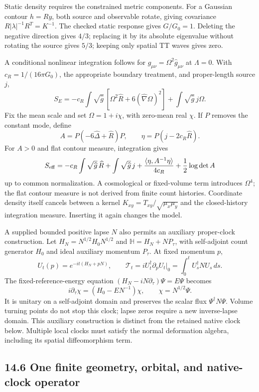 \documentclass[11pt]{article}
\begin{document}
Static density requires the constrained metric components.
For a Gaussian contour \(h=Ry\), both source and observable
rotate, giving covariance \(R|\lambda|^{-1}R^T=K^{-1}\).
The checked static response gives \(G/G_0=1\).
Deleting the negative direction gives \(4/3\); replacing it
by its absolute eigenvalue without rotating the source gives
\(5/3\); keeping only spatial TT waves gives zero.

A conditional nonlinear integration follows for
\(g_{\mu\nu}=\Omega^2\widehat g_{\mu\nu}\) at \(\Lambda=0\).
With \(c_R=1/(16\pi G_0)\), the appropriate boundary treatment,
and proper-length source \(j\),
\[
S_E=-c_R\int\sqrt{\widehat g}
\,[\Omega^2\widehat R+6(\widehat\nabla\Omega)^2]
+\int\sqrt{\widehat g}\,j\Omega .
\]
Fix the mean scale and set \(\Omega=1+i\chi\), with zero-mean
real \(\chi\). If \(P\) removes the constant mode, define
\[
A=P(-6\widehat\Delta+\widehat R)P,\qquad
\eta=P(j-2c_R\widehat R).
\]
For \(A>0\) and flat contour measure, integration gives
\[
S_{\rm eff}=-c_R\int\sqrt{\widehat g}\,\widehat R
+\int\sqrt{\widehat g}\,j
+\frac{\langle\eta,A^{-1}\eta\rangle}{4c_R}
+\frac12\log\det A
\]
up to common normalization. A cosmological or fixed-volume term
introduces \(\Omega^4\); the flat contour measure is not derived
from finite count histories. Coordinate density itself cancels
between a kernel \(K_{xy}=T_{xy}/\sqrt{\mu_x\mu_y}\) and the
closed-history integration measure. Inserting it again changes
the model.

A supplied bounded positive lapse \(N\) also permits an
auxiliary proper-clock construction. Let
\(H_N=N^{1/2}H_0N^{1/2}\) and
\(\mathbb H=H_N+NP_\tau\), with self-adjoint count generator
\(H_0\) and ideal auxiliary momentum \(P_\tau\).
At fixed momentum \(p\),
\[
U_t(p)=e^{-it(H_N+pN)},\qquad
\mathcal T_t=iU_t^\dagger\partial_pU_t\big|_0
=\int_0^tU_s^\dagger NU_s\,ds .
\]
The fixed-reference-energy equation
\((H_N-iN\partial_\tau)\Psi=E\Psi\) becomes
\[
i\partial_\tau\chi=(H_0-EN^{-1})\chi,\qquad
\chi=N^{1/2}\Psi.
\]
It is unitary on a self-adjoint domain and preserves the scalar
flux \(\Psi^\dagger N\Psi\). Volume turning points do not stop
this clock; lapse zeros require a new inverse-lapse domain.
This auxiliary construction is distinct from the retained native
clock below. Multiple local clocks must satisfy the normal
deformation algebra, including its spatial diffeomorphism term.

\subsection{14.6 One finite geometry, orbital, and native-clock operator}
\end{document}
